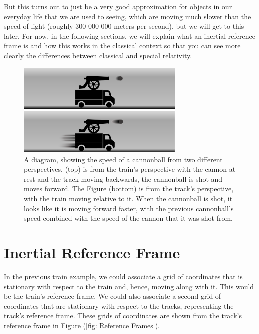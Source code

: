 But this turns out to just be a very good approximation for objects in our everyday life that we are used to seeing, which are moving much slower than the speed of light (roughly 300 000 000 meters per second), but we will get to this later.
For now, in the following sections, we will explain what an inertial reference frame is and how this works in the classical context so that you can see more clearly the differences between classical and special relativity.

\begin{figure}[H]
	\centering
	\includegraphics[width=8cm]{images/pdf/lorry_cannonball.pdf}
	\caption{A diagram, showing the speed of a cannonball from two different perspectives, (top) is from the train's perspective with the cannon at rest and the track moving backwards, the cannonball is shot and moves forward. The Figure (bottom) is from the track's perspective, with the train moving relative to it. When the cannonball is shot, it looks like it is moving forward faster, with the previous cannonball's speed combined with the speed of the cannon that it was shot from.}
	\label{fig: train cannonball}
\end{figure}

\section{Inertial Reference Frame}

In the previous train example, we could associate a grid of coordinates that is stationary with respect to the train and, hence, moving along with it.
This would be the train's reference frame.
We could also associate a second grid of coordinates that are stationary with respect to the tracks, representing the track's reference frame.
These grids of coordinates are shown from the track's reference frame in Figure (\ref{fig: Reference Frames}).

